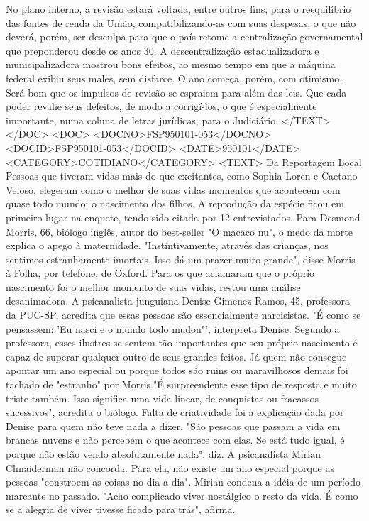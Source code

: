 No plano interno, a revisão estará voltada, entre outros fins, para o reequilíbrio das fontes de renda da União, compatibilizando-as com suas despesas, o que não deverá, porém, ser desculpa para que o país retome a centralização governamental que preponderou desde os anos 30. A descentralização estadualizadora e municipalizadora mostrou bons efeitos, ao mesmo tempo em que a máquina federal exibiu seus males, sem disfarce.
O ano começa, porém, com otimismo. Será bom que os impulsos de revisão se espraiem para além das leis. Que cada poder revalie seus defeitos, de modo a corrigí-los, o que é especialmente importante, numa coluna de letras jurídicas, para o Judiciário.
</TEXT>
</DOC>
<DOC>
<DOCNO>FSP950101-053</DOCNO>
<DOCID>FSP950101-053</DOCID>
<DATE>950101</DATE>
<CATEGORY>COTIDIANO</CATEGORY>
<TEXT>
Da Reportagem Local 
Pessoas que tiveram vidas mais do que excitantes, como Sophia Loren e Caetano Veloso, elegeram como o melhor de suas vidas momentos que acontecem com quase todo mundo: o nascimento dos filhos.
A reprodução da espécie ficou em primeiro lugar na enquete, tendo sido citada por 12 entrevistados. Para Desmond Morris, 66, biólogo inglês, autor do best-seller "O macaco nu", o medo da morte explica o apego à maternidade. "Instintivamente, através das crianças, nos sentimos estranhamente imortais. Isso dá um prazer muito grande", disse Morris à Folha, por telefone, de Oxford.
Para os que aclamaram que o próprio nascimento foi o melhor momento de suas vidas, restou uma análise desanimadora. A psicanalista junguiana Denise Gimenez Ramos, 45, professora da PUC-SP, acredita que essas pessoas são essencialmente narcisistas. "É como se pensassem: 'Eu nasci e o mundo todo mudou"', interpreta Denise.
Segundo a professora, esses ilustres se sentem tão importantes que seu próprio nascimento é capaz de superar qualquer outro de seus grandes feitos.
Já quem não consegue apontar um ano especial ou porque todos são ruins ou maravilhosos demais foi tachado de "estranho" por Morris."É surpreendente esse tipo de resposta e muito triste também. Isso significa uma vida linear, de conquistas ou fracassos sucessivos", acredita o biólogo.
Falta de criatividade foi a explicação dada por Denise para quem não teve nada a dizer. "São pessoas que passam a vida em brancas nuvens e não percebem o que acontece com elas. Se está tudo igual, é porque não estão vendo absolutamente nada", diz.
A psicanalista Mirian Chnaiderman não concorda. Para ela, não existe um ano especial porque as pessoas "constroem as coisas no dia-a-dia". Mirian condena a idéia de um período marcante no passado. "Acho complicado viver nostálgico o resto da vida. É como se a alegria de viver tivesse ficado para trás", afirma.

